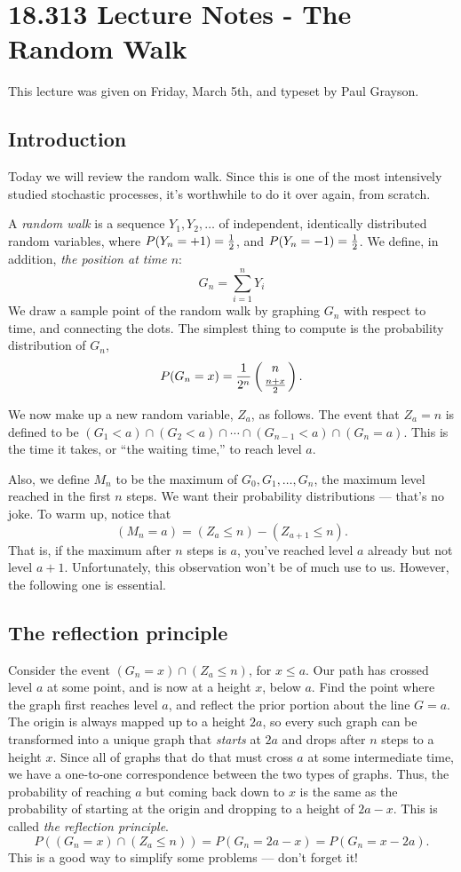 
\def\given{\mathrel|}



\section{18.313 Lecture Notes - The Random Walk}\label{random-walk}
This lecture was given on Friday, March 5th, and typeset by Paul
Grayson. 

\subsection{Introduction}\label{sec-intro}
Today we will review the random walk.  Since this is one of the most
intensively studied stochastic processes, it's worthwhile to do it
over again, from scratch.

A {\sl random walk} is a sequence $Y_1, Y_2, \ldots$ of independent,
identically distributed random variables, where
$P(Y_n=+1) = {1\over 2}$, and $P(Y_n=-1) = {1\over 2}$.
We define, in addition, {\sl the position at time $n$}:
$$G_n = \sum_{i=1}^n Y_i$$
We draw a sample point of the random walk by graphing $G_n$ with
respect to time, and connecting the dots.  The simplest thing to
compute is the probability distribution of $G_n$,
$$P(G_n=x) = {1\over 2^n} \left( n \atop {n+x \over 2} \right).$$

We now make up a new random variable, $Z_a$, as follows.  The event
that $Z_a=n$ is defined to be
$(G_1<a)\cap(G_2<a)\cap\cdots\cap(G_{n-1}<a)\cap(G_n=a).$  This is
the time it takes, or ``the waiting time,'' to reach level $a$.

Also, we define $M_n$ to be the maximum of $G_0,G_1,\ldots,G_n$, the
maximum level reached in the first $n$ steps.  We want their
probability distributions --- that's no joke.  To warm up, notice
that $$(M_n=a) = (Z_a\le n)-(Z_{a+1}\le n).$$  That is, if the maximum
after $n$ steps is $a$, you've reached level $a$ already but not level
$a+1$.  Unfortunately, this observation won't be of much use to us.
However, the following one is essential.

\subsection{The reflection principle}\label{sec-reflec}
Consider the event $(G_n=x)\cap(Z_a\le n)$, for $x\le a$.  Our path
has crossed level $a$ at some point, and is now at a height $x$, below
$a$.  Find the point where the graph first reaches level $a$, and
reflect the prior portion about the line $G=a$.  The origin is always
mapped up to a height $2a$, so every such graph can be transformed
into a unique graph that {\sl starts\/} at $2a$ and drops after $n$
steps to a 
height $x$.  Since all of graphs that do that must cross $a$ at some
intermediate time, we have a one-to-one correspondence between the two
types of graphs.  Thus, the probability of reaching $a$ but coming
back down to $x$ is the same as the probability of starting at the
origin and dropping to a height of $2a-x$.  This is called {\sl the
reflection principle}.
$$P((G_n=x)\cap(Z_a\le n)) = P(G_n=2a-x) = P(G_n=x-2a).$$
This is a good way to simplify some problems --- don't forget it!
\bigskip

